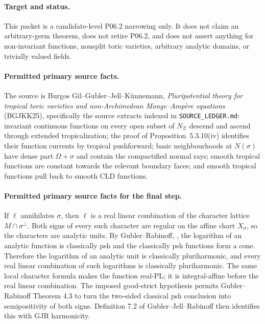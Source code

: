 \paragraph{Target and status.}
This packet is a candidate-level P06.2 narrowing only. It does not claim an arbitrary-germ theorem, does not retire P06.2, and does not assert anything for non-invariant functions, nonsplit toric varieties, arbitrary analytic domains, or trivially valued fields.

\paragraph{Permitted primary source facts.}
The source is Burgos Gil--Gubler--Jell--K\"unnemann, \emph{Pluripotential theory for tropical toric varieties and non-Archimedean Monge--Amp\`ere equations} (BGJKK25), specifically the source extracts indexed in \texttt{SOURCE\_LEDGER.md}: invariant continuous functions on every open subset of $N_\Sigma$ descend and ascend through extended tropicalization; the proof of Proposition~5.3.10(iv) identifies their function currents by tropical pushforward; basic neighbourhoods at $N(\sigma)$ have dense part $\Omega+\sigma$ and contain the compactified normal rays; smooth tropical functions are constant towards the relevant boundary faces; and smooth tropical functions pull back to smooth CLD functions.

\paragraph{Permitted primary source facts for the final step.}
If $\ell$ annihilates $\sigma$, then $\ell$ is a real linear combination of the character lattice $M\cap\sigma^\perp$. Both signs of every such character are regular on the affine chart $X_\sigma$, so the characters are analytic units. By Gubler--Rabinoff, \cite[Proposition~4.2(2),(3)]{GR25Classical}, the logarithm of an analytic function is classically psh and the classically psh functions form a cone. Therefore the logarithm of an analytic unit is classically pluriharmonic, and every real linear combination of such logarithms is classically pluriharmonic. The same local character formula makes the function real-PL; it is integral-affine before the real linear combination. The imposed good-strict hypothesis permits Gubler--Rabinoff Theorem 4.3 to turn the two-sided classical psh conclusion into semipositivity of both signs. Definition 7.2 of Gubler--Jell--Rabinoff then identifies this with GJR harmonicity.

